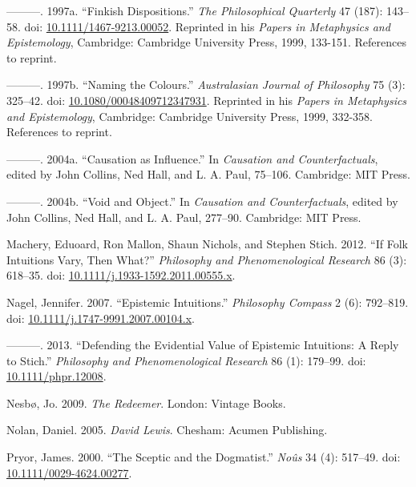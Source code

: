 \documentclass[
  10pt,
  letterpaper,
  DIV=11,
  numbers=noendperiod,
  twoside]{scrartcl}
\newlength{\cslhangindent}
\newenvironment{CSLReferences}[2] %
 {\begin{list}{}{%
  \setlength{\itemindent}{0pt}
  \setlength{\leftmargin}{0pt}
  \setlength{\parsep}{0pt}
  \ifodd #1
   \setlength{\leftmargin}{\cslhangindent}
   \setlength{\itemindent}{-1\cslhangindent}
  \fi
  \setlength{\itemsep}{#2\baselineskip}}}
 {\end{list}}
\begin{document}
\begin{CSLReferences}{1}{0}
---------. 1997a. {``Finkish Dispositions.''} \emph{The Philosophical
Quarterly} 47 (187): 143--58. doi:
\href{https://doi.org/10.1111/1467-9213.00052}{10.1111/1467-9213.00052}.
Reprinted in his \emph{Papers in Metaphysics and Epistemology},
Cambridge: Cambridge University Press, 1999, 133-151. References to
reprint.

---------. 1997b. {``Naming the Colours.''} \emph{Australasian Journal
of Philosophy} 75 (3): 325--42. doi:
\href{https://doi.org/10.1080/00048409712347931}{10.1080/00048409712347931}.
Reprinted in his \emph{Papers in Metaphysics and Epistemology},
Cambridge: Cambridge University Press, 1999, 332-358. References to
reprint.

---------. 2004a. {``Causation as Influence.''} In \emph{Causation and
Counterfactuals}, edited by John Collins, Ned Hall, and L. A. Paul,
75--106. Cambridge: {MIT} Press.

---------. 2004b. {``Void and Object.''} In \emph{Causation and
Counterfactuals}, edited by John Collins, Ned Hall, and L. A. Paul,
277--90. Cambridge: {MIT} Press.

Machery, Eduoard, Ron Mallon, Shaun Nichols, and Stephen Stich. 2012.
{``If Folk Intuitions Vary, Then What?''} \emph{Philosophy and
Phenomenological Research} 86 (3): 618--35. doi:
\href{https://doi.org/10.1111/j.1933-1592.2011.00555.x}{10.1111/j.1933-1592.2011.00555.x}.

Nagel, Jennifer. 2007. {``Epistemic Intuitions.''} \emph{Philosophy
Compass} 2 (6): 792--819. doi:
\href{https://doi.org/10.1111/j.1747-9991.2007.00104.x}{10.1111/j.1747-9991.2007.00104.x}.

---------. 2013. {``Defending the Evidential Value of Epistemic
Intuitions: A Reply to Stich.''} \emph{{P}hilosophy and
{P}henomenological {R}esearch} 86 (1): 179--99. doi:
\href{https://doi.org/10.1111/phpr.12008}{10.1111/phpr.12008}.

Nesbø, Jo. 2009. \emph{The Redeemer}. London: Vintage Books.

Nolan, Daniel. 2005. \emph{David Lewis}. Chesham: Acumen Publishing.

Pryor, James. 2000. {``The Sceptic and the Dogmatist.''} \emph{No{û}s}
34 (4): 517--49. doi:
\href{https://doi.org/10.1111/0029-4624.00277}{10.1111/0029-4624.00277}.


\end{CSLReferences}
\end{document}

